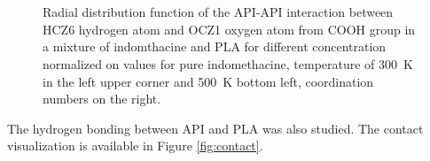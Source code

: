 \begin{figure}[htb!]
	\centering
	\\
	\\
	\caption{Radial distribution function of the API-API interaction between HCZ6 hydrogen atom and OCZ1 oxygen atom from COOH group in a mixture of indomthacine and PLA for different concentration normalized on values for pure indomethacine, temperature of 300~K in the left upper corner and 500~K bottom left, coordination numbers on the right.}
	\label{fig:indo_RDF_}
\end{figure}




The hydrogen bonding between API and PLA was also studied. The contact visualization is available in Figure \ref{fig:contact}.


